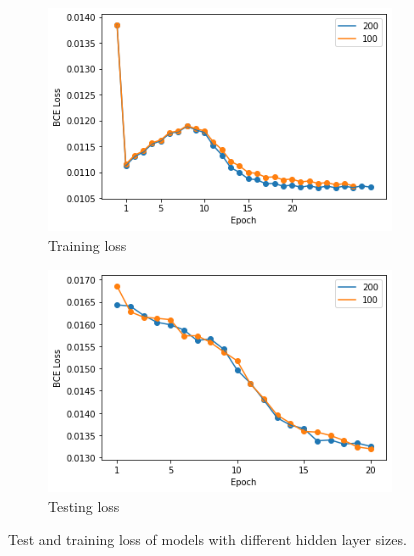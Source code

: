 \begin{figure}
  \begin{subfigure}[t]{.5\textwidth}
    \centering
    \includegraphics[width=\textwidth]{figures/supervised_approach/hidden_train_loss.png}
    \caption{Training loss}
    \label{fig:hidden_train_loss}
  \end{subfigure}
   \begin{subfigure}[t]{.5\textwidth}
    \centering
    \includegraphics[width=\textwidth]{figures/supervised_approach/hidden_test_loss.png}
    \caption{Testing loss}
    \label{fig:hidden_test_loss}
  \end{subfigure}
  \caption{Test and training loss of models with different hidden layer sizes.}
  \label{fig:hidden_train}
\end{figure}

